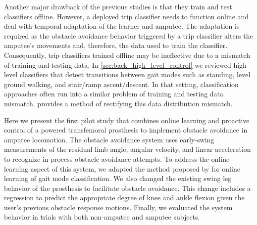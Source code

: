 Another major drawback of the previous studies is that they train and test 
classifiers offline. However, a deployed trip classifier needs to function
online and deal with temporal adaptation of the learner and amputee. The
adaptation is required as the obstacle avoidance behavior triggered by a trip
classifier alters the amputee's movements and, therefore, the data used to train
the classifier. Consequently, trip classifiers trained offline may be
ineffective due to a mismatch of training and testing data. In
\cref{sec:back_high_level_control} we reviewed high-level classifiers that
detect transitions between gait modes such as standing, level ground walking,
and stair/ramp ascent/descent. In that setting, classification approaches often
run into a similar problem of training and testing data mismatch.
\citet{spanias2018online} provides a method of rectifying this data distribution
mismatch.

Here we present the first pilot study that combines online learning and
proactive control of a powered transfemoral prosthesis to implement obstacle
avoidance in amputee locomotion. The obstacle avoidance system uses early-swing
measurements of the residual limb angle, angular velocity, and linear
acceleration to recognize in-process obstacle avoidance attempts. To address the
online learning aspect of this system, we adapted the method proposed by
\citet{spanias2018online} for online learning of gait mode classification. We
also changed the existing swing leg behavior of the prosthesis to facilitate
obstacle avoidance. This change includes a regression to predict the appropriate
degree of knee and ankle flexion given the user's previous obstacle response
motions. Finally, we evaluated the system behavior in trials with both
non-amputee and amputee subjects.
